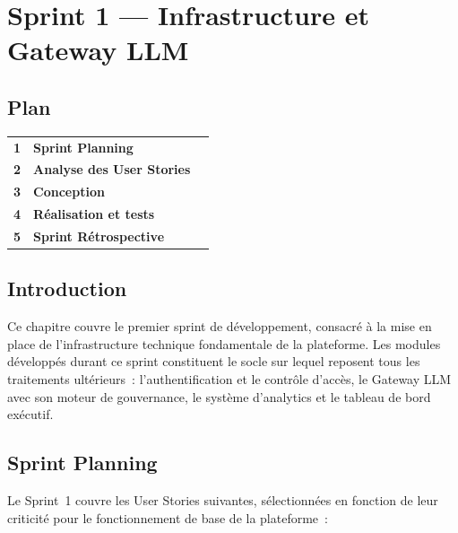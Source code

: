 
\chapter{Sprint 1 --- Infrastructure et Gateway LLM}

\section*{Plan}

\begin{tabular}{r l r}
\textbf{1} & \textbf{Sprint Planning} & \textbf{\pageref{sec:s1_planning}} \\
\textbf{2} & \textbf{Analyse des User Stories} & \textbf{\pageref{sec:s1_stories}} \\
\textbf{3} & \textbf{Conception} & \textbf{\pageref{sec:s1_conception}} \\
\textbf{4} & \textbf{Réalisation et tests} & \textbf{\pageref{sec:s1_realisation}} \\
\textbf{5} & \textbf{Sprint Rétrospective} & \textbf{\pageref{sec:s1_retro}} \\
\end{tabular}

\section*{Introduction}

Ce chapitre couvre le premier sprint de développement, consacré à la mise en place de l'infrastructure technique fondamentale de la plateforme. Les modules développés durant ce sprint constituent le socle sur lequel reposent tous les traitements ultérieurs~: l'authentification et le contrôle d'accès, le Gateway LLM avec son moteur de gouvernance, le système d'analytics et le tableau de bord exécutif.

\section{Sprint Planning}
\label{sec:s1_planning}

Le Sprint~1 couvre les User Stories suivantes, sélectionnées en fonction de leur criticité pour le fonctionnement de base de la plateforme~:

